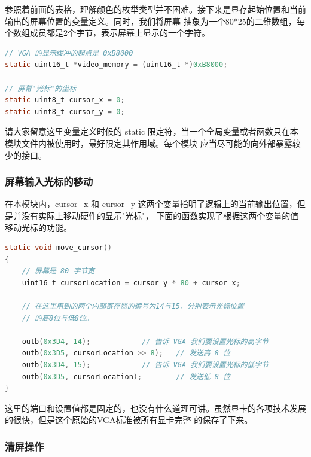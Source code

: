 \par 参照着前面的表格，理解颜色的枚举类型并不困难。接下来是显存起始位置和当前输出的屏幕位置的变量定义。同时，我们将屏幕\allowbreak
抽象为一个80*25的二维数组，每个数组成员都是2个字节，表示屏幕上显示的一个字符。

\begin{lstlisting}[language = C, label = drivers/console.c, caption = drivers/console.c]
// VGA 的显示缓冲的起点是 0xB8000
static uint16_t *video_memory = (uint16_t *)0xB8000;

// 屏幕"光标"的坐标
static uint8_t cursor_x = 0;
static uint8_t cursor_y = 0;
\end{lstlisting}

\par 请大家留意这里变量定义时候的 static 限定符，当一个全局变量或者函数只在本模块文件内被使用时，最好限定其作用域。每个模块\allowbreak
应当尽可能的向外部暴露较少的接口。

\subsubsection{屏幕输入光标的移动}

\par 在本模块内，cursor\_x 和 cursor\_y 这两个变量指明了逻辑上的当前输出位置，但是并没有实际上移动硬件的显示"光标"，\allowbreak
下面的函数实现了根据这两个变量的值移动光标的功能。

\begin{lstlisting}[language = C, label = drivers/console.c, caption = drivers/console.c]
static void move_cursor()
{
	// 屏幕是 80 字节宽
	uint16_t cursorLocation = cursor_y * 80 + cursor_x;
	
	// 在这里用到的两个内部寄存器的编号为14与15，分别表示光标位置
	// 的高8位与低8位。

	outb(0x3D4, 14); 			// 告诉 VGA 我们要设置光标的高字节
	outb(0x3D5, cursorLocation >> 8); 	// 发送高 8 位
	outb(0x3D4, 15); 			// 告诉 VGA 我们要设置光标的低字节
	outb(0x3D5, cursorLocation);      	// 发送低 8 位
}
\end{lstlisting}

\par 这里的端口和设置值都是固定的，也没有什么道理可讲。虽然显卡的各项技术发展的很快，但是这个原始的VGA标准被所有显卡完整\allowbreak
的保存了下来。

\subsubsection{清屏操作}

